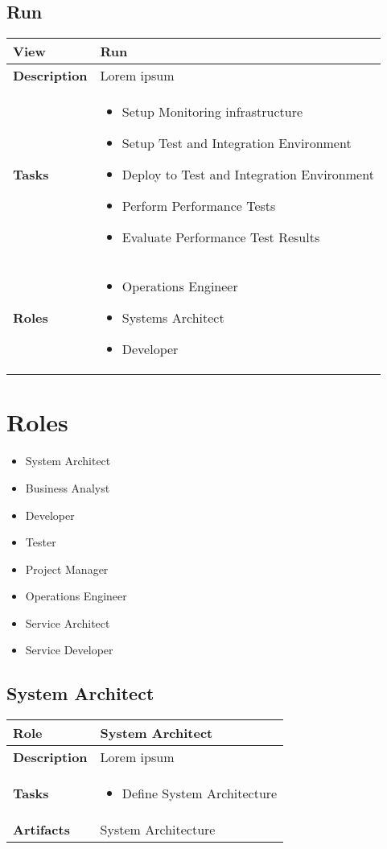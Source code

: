 \subsection{Run}

\label{table:ch6_View_Build}
\begin{tabular}
	{|m{2cm}|m{10cm}|} \hline \bfseries View & Run\\
	\hline \bfseries Description & Lorem ipsum\\
	\hline \bfseries Tasks & 
	\begin{itemize}
		\item Setup Monitoring infrastructure
		\item Setup Test and Integration Environment
		\item Deploy to Test and Integration Environment
		\item Perform Performance Tests
		\item Evaluate Performance Test Results
	\end{itemize}
	\\
	\hline \bfseries Roles &
	\begin{itemize}
		\item Operations Engineer
		\item Systems Architect
		\item Developer
	\end{itemize}
	\\
	\hline 
\end{tabular}

\section{Roles} 
\begin{itemize}
	\item System Architect 
	\item Business Analyst 
	\item Developer 
	\item Tester 
	\item Project Manager 
	\item Operations Engineer 
	\item Service Architect 
	\item Service Developer
\end{itemize}

\subsection{System Architect} 
	\label{table:ch6_Role_System_Architect}
\begin{tabular}
	{|m{2cm}|m{10cm}|} \hline \bfseries Role & System Architect\\
	\hline \bfseries Description & Lorem ipsum\\
	\hline \bfseries Tasks & 
	\begin{itemize}
		\item Define System Architecture 
	\end{itemize}
	\\
	\hline \bfseries Artifacts & System Architecture\\
	\hline 
\end{tabular}

